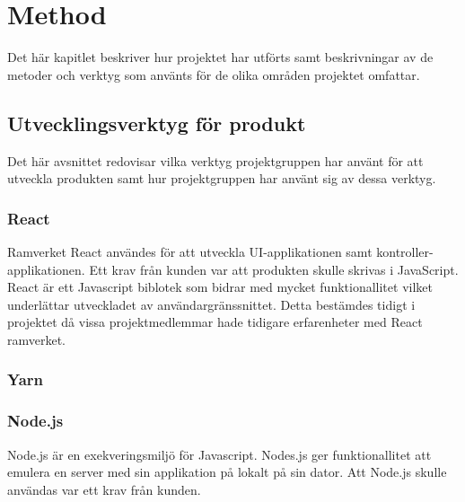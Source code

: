 
\chapter{Method}
\label{cha:method}
Det här kapitlet beskriver hur projektet har utförts samt beskrivningar av de metoder och verktyg som använts för de olika områden projektet omfattar.

\section{Utvecklingsverktyg för produkt}
Det här avsnittet redovisar vilka verktyg projektgruppen har använt för att utveckla produkten samt hur projektgruppen har använt sig av dessa verktyg.

\subsection*{React}
Ramverket React användes för att utveckla UI-applikationen samt kontroller-applikationen. Ett krav från kunden var att produkten skulle skrivas i JavaScript. React är ett Javascript biblotek som bidrar med mycket funktionallitet vilket underlättar utveckladet av användargränssnittet.  Detta bestämdes tidigt i projektet då vissa projektmedlemmar hade tidigare erfarenheter med React ramverket.

\subsection*{Yarn}

\subsection*{Node.js}
Node.js är en exekveringsmiljö för Javascript. Nodes.js ger funktionallitet att emulera en server med sin applikation på lokalt på sin dator. Att Node.js skulle användas var ett krav från kunden.

